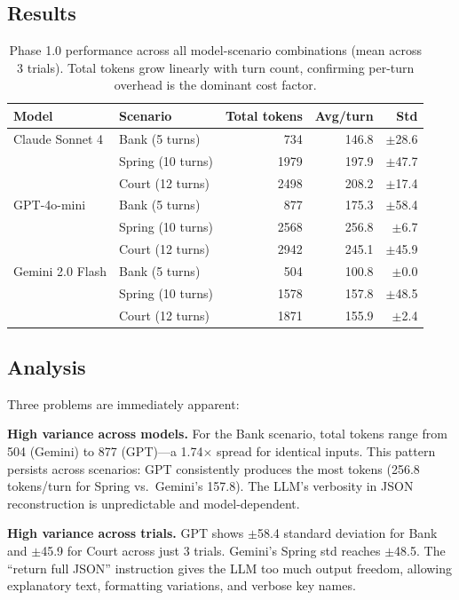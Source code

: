 \documentclass[11pt,a4paper]{article}
\begin{document}
\subsection{Results}

\begin{table}[ht]
\centering
\begin{tabular}{llrrr}
\toprule
\textbf{Model} & \textbf{Scenario} & \textbf{Total tokens} & \textbf{Avg/turn} & \textbf{Std} \\
\midrule
Claude Sonnet 4 & Bank (5 turns) & 734 & 146.8 & $\pm$28.6 \\
                & Spring (10 turns) & 1979 & 197.9 & $\pm$47.7 \\
                & Court (12 turns) & 2498 & 208.2 & $\pm$17.4 \\
\midrule
GPT-4o-mini     & Bank (5 turns) & 877 & 175.3 & $\pm$58.4 \\
                & Spring (10 turns) & 2568 & 256.8 & $\pm$6.7 \\
                & Court (12 turns) & 2942 & 245.1 & $\pm$45.9 \\
\midrule
Gemini 2.0 Flash & Bank (5 turns) & 504 & 100.8 & $\pm$0.0 \\
                  & Spring (10 turns) & 1578 & 157.8 & $\pm$48.5 \\
                  & Court (12 turns) & 1871 & 155.9 & $\pm$2.4 \\
\bottomrule
\end{tabular}
\caption{Phase 1.0 performance across all model-scenario combinations (mean across 3 trials).
Total tokens grow linearly with turn count, confirming per-turn overhead is the dominant cost factor.}
\label{tab:phase1_0}
\end{table}

\subsection{Analysis}

Three problems are immediately apparent:

\textbf{High variance across models.} For the Bank scenario, total tokens range from 504 (Gemini) to
877 (GPT)---a 1.74$\times$ spread for identical inputs. This pattern persists across scenarios:
GPT consistently produces the most tokens (256.8 tokens/turn for Spring vs.\ Gemini's 157.8).
The LLM's verbosity in JSON reconstruction is unpredictable and model-dependent.

\textbf{High variance across trials.} GPT shows $\pm$58.4 standard deviation for Bank
and $\pm$45.9 for Court across just 3 trials. Gemini's Spring std reaches $\pm$48.5.
The ``return full JSON'' instruction gives the LLM too much output freedom, allowing
explanatory text, formatting variations, and verbose key names.
\end{document}
